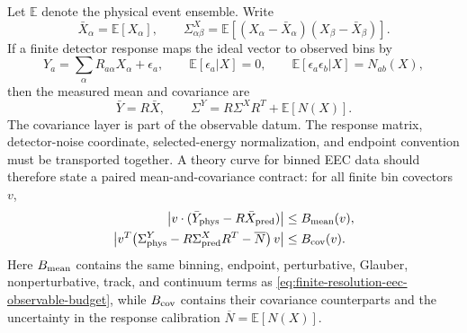\begin{controlledapproximation}
Let \(\mathbb E\) denote the physical event ensemble.  Write
\begin{equation}
  \bar X_\alpha=\mathbb E[X_\alpha],
  \qquad
  \Sigma^X_{\alpha\beta}
  =
  \mathbb E[(X_\alpha-\bar X_\alpha)(X_\beta-\bar X_\beta)] .
  \label{eq:measured-eec-event-covariance}
\end{equation}
If a finite detector response maps the ideal vector to observed bins by
\begin{equation}
  Y_a
  =
  \sum_\alpha R_{a\alpha}X_\alpha+\epsilon_a,
  \qquad
  \mathbb E[\epsilon_a|X]=0,\qquad
  \mathbb E[\epsilon_a\epsilon_b|X]=N_{ab}(X),
  \label{eq:measured-eec-linear-response-model}
\end{equation}
then the measured mean and covariance are
\begin{equation}
  \bar Y=R\bar X,
  \qquad
  \Sigma^Y=R\Sigma^X R^{T}+\mathbb E[N(X)] .
  \label{eq:measured-eec-response-covariance}
\end{equation}
The covariance layer is part of the observable datum.  The response matrix,
detector-noise coordinate, selected-energy normalization, and endpoint
convention must be transported together.  A theory curve for binned EEC data
should therefore state a paired mean-and-covariance contract: for all finite
bin covectors \(v\),
\begin{equation}
  \begin{aligned}
  \left|v\cdot(\bar Y_{\rm phys}-R\bar X_{\rm pred})\right|
  &\le B_{\rm mean}(v),\\
  \left|
  v^T\!
  \left(
    \Sigma^Y_{\rm phys}
    -R\Sigma^{X}_{\rm pred}R^T
    -\overline N
  \right)v
  \right|
  &\le B_{\rm cov}(v).
  \end{aligned}
  \label{eq:measured-eec-mean-covariance-contract}
\end{equation}
Here \(B_{\rm mean}\) contains the same binning, endpoint, perturbative,
Glauber, nonperturbative, track, and continuum terms as
\eqref{eq:finite-resolution-eec-observable-budget}, while \(B_{\rm cov}\)
contains their covariance counterparts and the uncertainty in the response
calibration \(\overline N=\mathbb E[N(X)]\).


\end{controlledapproximation}
